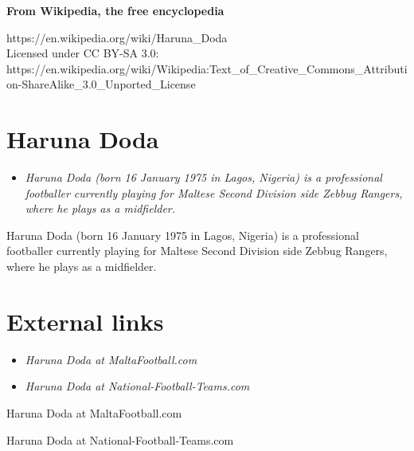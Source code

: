 \textbf{From Wikipedia, the free encyclopedia}

https://en.wikipedia.org/wiki/Haruna\_Doda\\
Licensed under CC BY-SA 3.0:\\
https://en.wikipedia.org/wiki/Wikipedia:Text\_of\_Creative\_Commons\_Attribution-ShareAlike\_3.0\_Unported\_License

\section{Haruna Doda}\label{haruna-doda}

\begin{itemize}
\item
  \emph{Haruna Doda (born 16 January 1975 in Lagos, Nigeria) is a
  professional footballer currently playing for Maltese Second Division
  side Zebbug Rangers, where he plays as a midfielder.}
\end{itemize}

Haruna Doda (born 16 January 1975 in Lagos, Nigeria) is a professional
footballer currently playing for Maltese Second Division side Zebbug
Rangers, where he plays as a midfielder.

\section{External links}\label{external-links}

\begin{itemize}
\item
  \emph{Haruna Doda at MaltaFootball.com}
\item
  \emph{Haruna Doda at National-Football-Teams.com}
\end{itemize}

Haruna Doda at MaltaFootball.com

Haruna Doda at National-Football-Teams.com
